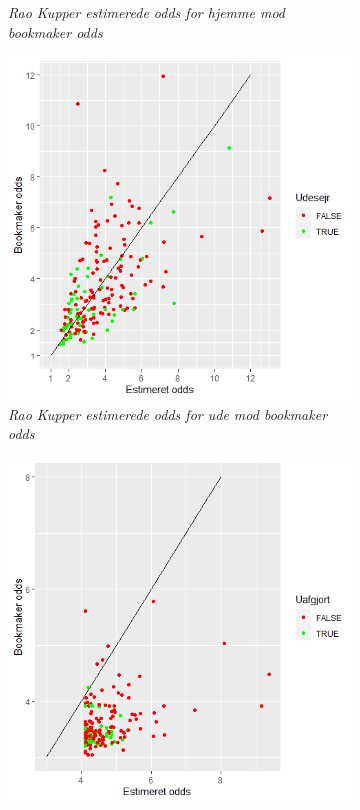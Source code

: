 \documentclass[11pt,a4paper]{article}
\begin{document}
\begin{figure}[h!]
\begin{subfigure}[b]{0.4\linewidth}
    \caption{\textit{Rao Kupper estimerede odds for hjemme mod bookmaker odds}}
    \label{fig:StatHjemmeOdds}  
    \end{subfigure}
          \hspace{0.2cm}
  \begin{subfigure}[b]{0.4\linewidth}
\includegraphics[width=\textwidth]{DynUdeOdds.png}
    \caption{\textit{Rao Kupper estimerede odds for ude mod bookmaker odds}}
    \label{fig:StatUdeOdds}  
    \end{subfigure}
          \hspace{0.2cm}
  \begin{subfigure}[b]{0.4\linewidth}
\includegraphics[width=\textwidth]{DynUafgjortOdds.png}

\end{subfigure}
\end{figure}
\end{document}
